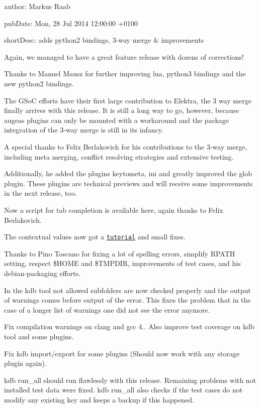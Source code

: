 
\begin{DoxyItemize}
\item author\+: Markus Raab
\item pub\+Date\+: Mon, 28 Jul 2014 12\+:00\+:00 +0100
\item short\+Desc\+: adds python2 bindings, 3-\/way merge \& improvements
\end{DoxyItemize}

Again, we managed to have a great feature release with dozens of corrections!

Thanks to Manuel Mausz for further improving lua, python3 bindings and the new python2 bindings.

The G\+SoC efforts have their first large contribution to Elektra, the 3 way merge finally arrives with this release. It is still a long way to go, however, because augeas plugins can only be mounted with a workaround and the package integration of the 3-\/way merge is still in its infancy.

A special thanks to Felix Berlakovich for his contributions to the 3-\/way merge, including meta merging, conflict resolving strategies and extensive testing.

Additionally, he added the plugins keytometa, ini and greatly improved the glob plugin. These plugins are technical previews and will receive some improvements in the next release, too.

Now a script for tab completion is available here, again thanks to Felix Berlakovich.

The contextual values now got a \href{https://master.libelektra.org/src/tools/pythongen}{\tt tutorial} and small fixes.

Thanks to Pino Toscano for fixing a lot of spelling errors, simplify R\+P\+A\+TH setting, respect \$\+H\+O\+ME and \$\+T\+M\+P\+D\+IR, improvements of test cases, and his debian-\/packaging efforts.

In the kdb tool not allowed subfolders are now checked properly and the output of warnings comes before output of the error. This fixes the problem that in the case of a longer list of warnings one did not see the error anymore.

Fix compilation warnings on clang and gcc 4.. Also improve test coverage on kdb tool and some plugins.

Fix kdb import/export for some plugins (Should now work with any storage plugin again).

kdb run\+\_\+all should run flawlessly with this release. Remaining problems with not installed test data were fixed. kdb run\+\_\+all also checks if the test cases do not modify any existing key and keeps a backup if this happened.

